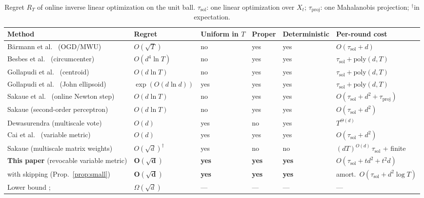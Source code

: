 \documentclass[11pt]{article}
\theoremstyle{plain}
\theoremstyle{definition}
\theoremstyle{remark}
\begin{document}
\begin{table}[t]
\centering\scriptsize\setlength{\tabcolsep}{4pt}
\begin{tabular}{@{}llllll@{}}
\toprule
Method & Regret & Uniform in $T$ & Proper & Deterministic & Per-round cost \\
\midrule
B\"armann et al.\ \cite{Barmann17,Barmann20} (OGD/MWU) & $O(\sqrt T)$ & no & yes & yes &
  $O(\tau_{\mathrm{sol}}+d)$ \\
Besbes et al.\ \cite{Besbes21,Besbes25} (circumcenter) & $O(d^{4}\ln T)$ & no & yes & yes &
  $\tau_{\mathrm{sol}}+\mathrm{poly}(d,T)$ \\
Gollapudi et al.\ \cite{GGKMPS} (centroid) & $O(d\ln T)$ & no & yes & yes &
  $\tau_{\mathrm{sol}}+\mathrm{poly}(d,T)$ \\
Gollapudi et al.\ \cite{GGKMPS} (John ellipsoid) & $\exp(O(d\ln d))$ & yes & yes & yes &
  $\tau_{\mathrm{sol}}+\mathrm{poly}(d,T)$ \\
Sakaue et al.\ \cite{SakaueONS} (online Newton step) & $O(d\ln T)$ & no & yes & yes &
  $O(\tau_{\mathrm{sol}}+d^{2}+\tau_{\mathrm{proj}})$ \\
Sakaue \cite{SakaueSOP} (second-order perceptron) & $O(d\ln T)$ & no & yes & yes &
  $O(\tau_{\mathrm{sol}}+d^{2})$ \\
Dewasurendra \cite{Dewasurendra26} (multiscale vote) & $O(d)$ & yes & no & yes & $T^{\Theta(d)}$ \\
Cai et al.\ \cite{Cai26} (variable metric) & $O(d)$ & yes & yes & yes &
  $O(\tau_{\mathrm{sol}}+d^{2})$ \\
Sakaue \cite{SakaueMMW} (multiscale matrix weights) & $O(\sqrt d)^{\dagger}$ & yes & no & no &
  $(dT)^{O(d)}\,\tau_{\mathrm{sol}}$ + finite \\
\midrule
\textbf{This paper} (revocable variable metric) & $\mathbf{O(\sqrt d)}$ & \textbf{yes} &
  \textbf{yes} & \textbf{yes} & $O(\tau_{\mathrm{sol}}+td^{2}+t^{2}d)$ \\
\quad with skipping (Prop.~\ref{prop:small}) & $\mathbf{O(\sqrt d)}$ & \textbf{yes} &
  \textbf{yes} & \textbf{yes} & amort.\ $O(\tau_{\mathrm{sol}}+d^{2}\log T)$ \\
\addlinespace
Lower bound \cite{SakaueONS}; \cite[Thm.~3.1]{Cai26} & $\Omega(\sqrt d)$ & --- & --- & --- & --- \\
\bottomrule
\end{tabular}
\caption{Regret $R_T$ of online inverse linear optimization on the unit ball. $\tau_{\mathrm{sol}}$:
one linear optimization over $X_t$; $\tau_{\mathrm{proj}}$: one Mahalanobis projection;
$^{\dagger}$in expectation.}
\label{tab:oilo}
\vspace{-1em}
\end{table}
\end{document}
